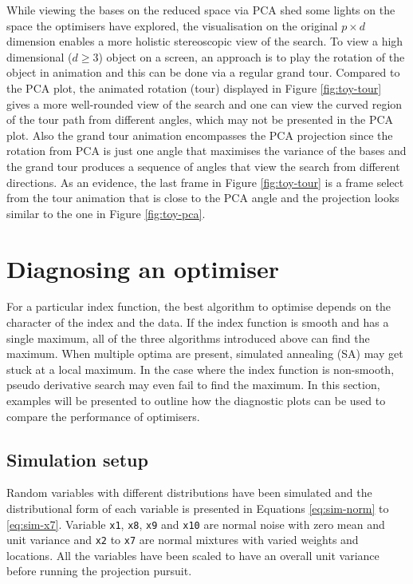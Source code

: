 While viewing the bases on the reduced space via PCA shed some lights on
the space the optimisers have explored, the visualisation on the
original \(p \times d\) dimension enables a more holistic stereoscopic
view of the search. To view a high dimensional (\(d \ge 3\)) object on a
screen, an approach is to play the rotation of the object in animation
and this can be done via a regular grand tour. Compared to the PCA plot,
the animated rotation (tour) displayed in Figure \ref{fig:toy-tour}
gives a more well-rounded view of the search and one can view the curved
region of the tour path from different angles, which may not be
presented in the PCA plot. Also the grand tour animation encompasses the
PCA projection since the rotation from PCA is just one angle that
maximises the variance of the bases and the grand tour produces a
sequence of angles that view the search from different directions. As an
evidence, the last frame in Figure \ref{fig:toy-tour} is a frame select
from the tour animation that is close to the PCA angle and the
projection looks similar to the one in Figure \ref{fig:toy-pca}.

\hypertarget{application}{%
\section{Diagnosing an optimiser}\label{application}}

For a particular index function, the best algorithm to optimise depends
on the character of the index and the data. If the index function is
smooth and has a single maximum, all of the three algorithms introduced
above can find the maximum. When multiple optima are present, simulated
annealing (SA) may get stuck at a local maximum. In the case where the
index function is non-smooth, pseudo derivative search may even fail to
find the maximum. In this section, examples will be presented to outline
how the diagnostic plots can be used to compare the performance of
optimisers.

\hypertarget{simulation-setup}{%
\subsection{Simulation setup}\label{simulation-setup}}

Random variables with different distributions have been simulated and
the distributional form of each variable is presented in Equations
\ref{eq:sim-norm} to \ref{eq:sim-x7}. Variable \texttt{x1}, \texttt{x8},
\texttt{x9} and \texttt{x10} are normal noise with zero mean and unit
variance and \texttt{x2} to \texttt{x7} are normal mixtures with varied
weights and locations. All the variables have been scaled to have an
overall unit variance before running the projection pursuit.

